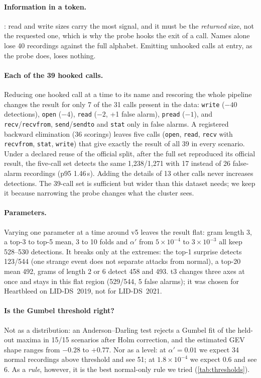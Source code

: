 \paragraph{Information in a token.} : read and write sizes carry the most signal, and it must be
the \emph{returned} size, not the requested one, which is why the probe hooks the exit of a call. Names alone lose 40
recordings against the full alphabet. Emitting unhooked calls at entry, as the probe does, loses nothing.

\paragraph{Each of the 39 hooked calls.} Reducing one hooked call at a time to its name and rescoring the whole
pipeline changes the result for only 7 of the 31 calls present in the data: \texttt{write} ($-40$ detections),
\texttt{open} ($-4$), \texttt{read} ($-2$, +1 false alarm), \texttt{pread} ($-1$), and \texttt{recv}/\texttt{recvfrom},
\texttt{send}/\texttt{sendto} and \texttt{stat} only in false alarms. A registered backward elimination (36 scorings)
leaves five calls (\texttt{open}, \texttt{read}, \texttt{recv} with \texttt{recvfrom}, \texttt{stat}, \texttt{write})
that give exactly the result of all 39 in every scenario. Under a declared reuse of the official split, after the full
set reproduced its official result, the five-call set detects the same 1{,}238/1{,}271 with 17 instead of 26
false-alarm recordings (p95 1.46\,s). Adding the details of 13 other calls never increases detections. The 39-call set
is sufficient but wider than this dataset needs; we keep it because narrowing the probe changes what the cluster sees.

\paragraph{Parameters.} Varying one parameter at a time around v5 leaves the result flat: gram length 3,
a top-3 to top-5 mean, 3 to 10 folds and $\alpha'$ from $5\times10^{-4}$ to $3\times10^{-3}$ all keep 528--530
detections. It breaks only at the extremes: the top-1 surprise detects 123/544 (one strange event does not separate
attacks from normal), a top-20 mean 492, grams of length 2 or 6 detect 458 and 493. t3 changes three axes at once and stays in this flat region (529/544, 5
false alarms); it was chosen for Heartbleed on LID-DS~2019, not for LID-DS~2021.

\paragraph{Is the Gumbel threshold right?} Not as a distribution: an Anderson--Darling test rejects a Gumbel fit of the
held-out maxima in 15/15 scenarios after Holm correction, and the estimated GEV shape ranges from $-0.28$ to $+0.77$.
Nor as a level: at $\alpha'=0.01$ we expect 34 normal recordings above threshold and see 51; at $1.8\times10^{-4}$ we
expect 0.6 and see 6. As a \emph{rule}, however, it is the best normal-only rule we tried (\cref{tab:thresholds}).

